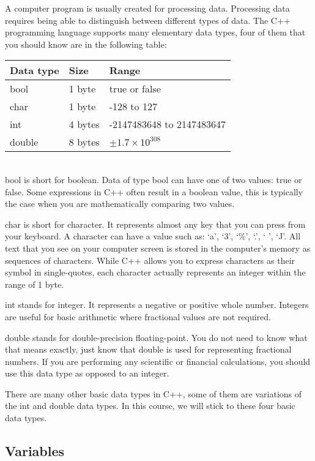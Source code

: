 \documentclass[a4paper,12pt]{article}
\begin{document}
A computer program is usually created for processing data. Processing data requires being able to distinguish between different types of data. The C++ programming language supports many elementary data types, four of them that you should know are in the following table: \\

\begin{tabular}{|l|l|l|}
\hline
{\bf Data type} & {\bf Size} & {\bf Range} \\
\hline
bool & 1 byte & true or false \\
\hline
char & 1 byte & -128 to 127 \\
\hline
int & 4 bytes & -2147483648 to 2147483647 \\
\hline
double & 8 bytes & $\pm1.7 \times 10^{308}$ \\
\hline
\end{tabular} \\

bool is short for boolean. Data of type bool can have one of two values: true or false. Some expressions in C++ often result in a boolean value, this is typically the case when you are mathematically comparing two values.

char is short for character. It represents almost any key that you can press from your keyboard. A character can have a value such as: `a', `3', `\%', `.', ` ', `J'. All text that you see on your computer screen is stored in the computer's memory as sequences of characters. While C++ allows you to express characters as their symbol in single-quotes, each character actually represents an integer within the range of 1 byte.

int stands for integer. It represents a negative or positive whole number. Integers are useful for basic arithmetic where fractional values are not required. 

double stands for double-precision floating-point. You do not need to know what that means exactly, just know that double is used for representing fractional numbers. If you are performing any scientific or financial calculations, you should use this data type as opposed to an integer. 

There are many other basic data types in C++, some of them are variations of the int and double data types. In this course, we will stick to these four basic data types.

\subsection*{Variables}
\end{document}
